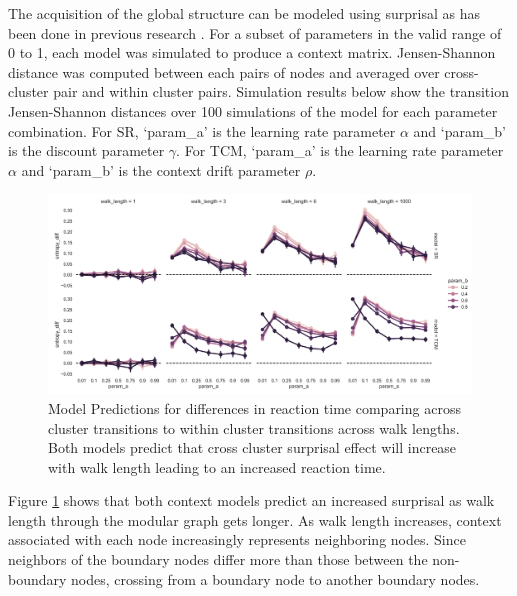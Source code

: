 The acquisition of the global structure can be modeled using surprisal as has been done in previous research \cite{lynn2020abstract,lynn2020humans,lynn2020human}. For a subset of parameters in the valid range of 0 to 1, each model was simulated to produce a context matrix. Jensen-Shannon distance was computed between each pairs of nodes and averaged over cross-cluster pair and within cluster pairs. Simulation results below show the transition Jensen-Shannon distances over 100 simulations of the model for each parameter combination. For SR, `param\_a' is the learning rate parameter $\alpha$ and `param\_b' is the discount parameter $\gamma$. For TCM, `param\_a' is the learning rate parameter $\alpha$ and `param\_b' is the context drift parameter $\rho$. 
\begin{figure}
	\centering
	\includegraphics[width = \textwidth]{chapter_notebooks/chapter_2/figures/SR_TCM_boundary_nonboundary_jsdist.png}
	\caption{Model Predictions for differences in reaction time comparing across cluster transitions to within cluster transitions across walk lengths. Both models predict that cross cluster surprisal effect will increase with walk length leading to an increased reaction time.}
	\label{fig:SR-TCM-walklength-transition-sjdist}
\end{figure}

Figure \ref{fig:SR-TCM-walklength-transition-sjdist} shows that both context models predict an increased surprisal as walk length through the modular graph gets longer. As walk length increases, context associated with each node increasingly represents neighboring nodes. Since neighbors of the boundary nodes differ more than those between the non-boundary nodes, crossing from a boundary node to another boundary nodes.


